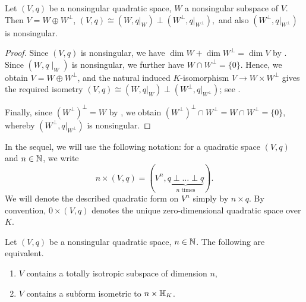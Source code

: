 \documentclass[12pt, leqno, british]{amsart}
\begin{document}
\begin{prop}\label{P:splitting-off}
Let $(V, q)$ be a nonsingular quadratic space, $W$ a nonsingular subspace of $V$.
Then $V = W \oplus W^\perp$,
$(V, q) \cong (W, q\vert_W) \perp (W^\perp, q\vert_{W^\perp}),$
and also $(W^\perp, q\vert_{W^\perp})$ is nonsingular.
\end{prop}
\begin{proof}
Since $(V, q)$ is nonsingular, we have $\dim W + \dim W^\perp = \dim V$ by .
Since $(W, q\mid_W)$ is nonsingular, we further have $W \cap W^\perp = \lbrace 0 \rbrace$.
Hence, we obtain $V = W \oplus W^\perp$, and the natural induced $K$-isomorphism $V \to W \times W^\perp$ gives the required isometry $(V, q) \cong (W, q\vert_W) \perp (W^\perp, q\vert_{W^\perp})$; see .

Finally, since $(W^\perp)^\perp = W$ by , we obtain $(W^\perp)^\perp \cap W^\perp = W \cap W^\perp = \lbrace 0 \rbrace$, whereby $(W^\perp, q\vert_{W^\perp})$ is nonsingular.
\end{proof}
In the sequel, we will use the following notation: for a quadratic space $(V, q)$ and $n \in \mathbb N$, we write
$$ n \times (V, q) = (V^n, \underbrace{q \perp \ldots \perp q}_{n \text{ times}}).$$
We will denote the described quadratic form on $V^n$ simply by $n \times q$.
By convention, $0 \times (V, q)$ denotes the unique zero-dimensional quadratic space over $K$.
\begin{prop}\label{P:hyperbolic-form}
Let $(V, q)$ be a nonsingular quadratic space, $n \in \mathbb N$.
The following are equivalent.
\begin{enumerate}
\item\label{it:hyperbolic-form-1} $V$ contains a totally isotropic subspace of dimension $n$,
\item\label{it:hyperbolic-form-2} $V$ contains a subform isometric to $n \times \mathbb{H}_K$.
\end{enumerate}
\end{prop}
\end{document}
